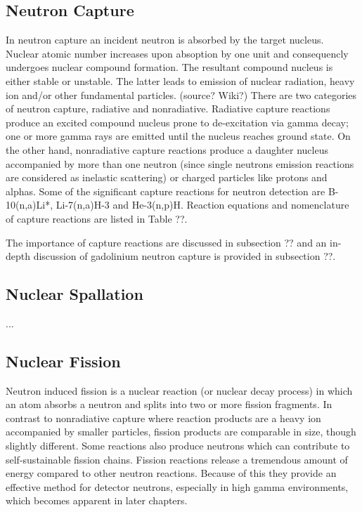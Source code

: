 \subsection{Neutron Capture}
In neutron capture an incident neutron is absorbed by the target nucleus. Nuclear atomic number increases upon absoption by one unit and consequencly undergoes nuclear compound formation. The resultant compound nucleus is either stable or unstable. The latter leads to emission of nuclear radiation, heavy ion and/or other fundamental particles. (source? Wiki?)
There are two categories of neutron capture, radiative and nonradiative. Radiative capture reactions produce an excited compound nucleus prone to de-excitation via gamma decay; one or more gamma rays are emitted until the nucleus reaches ground state.
On the other hand, nonradiative capture reactions produce a daughter nucleus accompanied by more than one neutron (since single neutrons emission reactions are considered as inelastic scattering) or charged particles like protons and alphas.
Some of the significant capture reactions for neutron detection are B-10(n,a)Li*, Li-7(n,a)H-3 and He-3(n,p)H.
Reaction equations and nomenclature of capture reactions are listed in Table ??.

The importance of capture reactions are discussed in subsection ?? and an in-depth discussion of gadolinium neutron capture is provided in subsection ??.

\subsection{Nuclear Spallation}
...
\subsection{Nuclear Fission}
Neutron induced fission is a nuclear reaction (or nuclear decay process) in which an atom absorbs a neutron and splits into two or more fission fragments. In contrast to nonradiative capture where reaction products are a heavy ion accompanied by smaller particles, fission products are comparable in size, though slightly different. Some reactions also produce neutrons which can contribute to self-sustainable fission chains.
Fission reactions release a tremendous amount of energy compared to other neutron reactions. Because of this they provide an effective method for detector neutrons, especially in high gamma environments, which becomes apparent in later chapters.
